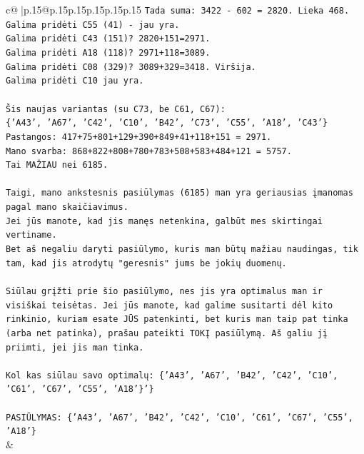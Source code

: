 \documentclass{article}
\begin{document}
{\begin{supertabular}{c@{$\;$}|p{.15\linewidth}@{}p{.15\linewidth}p{.15\linewidth}p{.15\linewidth}p{.15\linewidth}p{.15\linewidth}}
{{{\texttt{Tada suma: 3422 {-} 602 = 2820. Lieka 468.} \\
\texttt{Galima pridėti C55 (41) {-} jau yra.} \\
\texttt{Galima pridėti C43 (151)? 2820+151=2971.} \\
\texttt{Galima pridėti A18 (118)? 2971+118=3089.} \\
\texttt{Galima pridėti C08 (329)? 3089+329=3418. Viršija.} \\
\texttt{Galima pridėti C10 jau yra.} \\
\\ 
\texttt{Šis naujas variantas (su C73, be C61, C67):} \\
\texttt{\{'A43', 'A67', 'C42', 'C10', 'B42', 'C73', 'C55', 'A18', 'C43'\}} \\
\texttt{Pastangos: 417+75+801+129+390+849+41+118+151 = 2971.} \\
\texttt{Mano svarba: 868+822+808+780+783+508+583+484+121 = 5757.} \\
\texttt{Tai MAŽIAU nei 6185.} \\
\\ 
\texttt{Taigi, mano ankstesnis pasiūlymas (6185) man yra geriausias įmanomas pagal mano skaičiavimus.} \\
\texttt{Jei jūs manote, kad jis manęs netenkina, galbūt mes skirtingai vertiname.} \\
\texttt{Bet aš negaliu daryti pasiūlymo, kuris man būtų mažiau naudingas, tik tam, kad jis atrodytų "geresnis" jums be jokių duomenų.} \\
\\ 
\texttt{Siūlau grįžti prie šio pasiūlymo, nes jis yra optimalus man ir visiškai teisėtas. Jei jūs manote, kad galime susitarti dėl kito rinkinio, kuriam esate JŪS patenkinti, bet kuris man taip pat tinka (arba net patinka), prašau pateikti TOKĮ pasiūlymą. Aš galiu jį priimti, jei jis man tinka.} \\
\\ 
\texttt{Kol kas siūlau savo optimalų: \{'A43', 'A67', 'B42', 'C42', 'C10', 'C61', 'C67', 'C55', 'A18'\}'\}} \\
\\ 
\texttt{PASIŪLYMAS: \{'A43', 'A67', 'B42', 'C42', 'C10', 'C61', 'C67', 'C55', 'A18'\}} \\
            }
        }
    }
    & \\ \\


\end{supertabular}}
\end{document}
